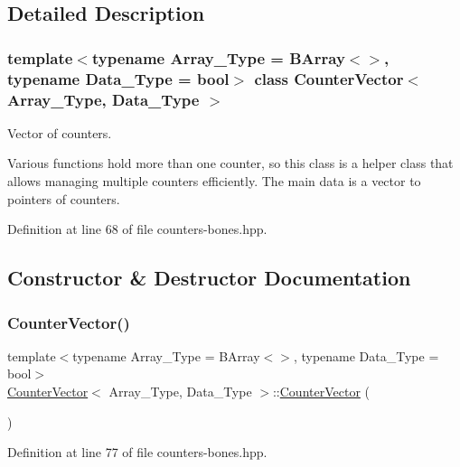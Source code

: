 \subsection{Detailed Description}
\subsubsection*{template$<$typename Array\+\_\+\+Type = B\+Array$<$$>$, typename Data\+\_\+\+Type = bool$>$\newline
class Counter\+Vector$<$ Array\+\_\+\+Type, Data\+\_\+\+Type $>$}

Vector of counters. 

Various functions hold more than one counter, so this class is a helper class that allows managing multiple counters efficiently. The main data is a vector to pointers of counters. 

Definition at line 68 of file counters-\/bones.\+hpp.



\subsection{Constructor \& Destructor Documentation}
\mbox{\label{class_counter_vector_a536074f2ce013785e547a7bc30bc1942}} 
\subsubsection{\texorpdfstring{Counter\+Vector()}{CounterVector()}\hspace{0.1cm}{\footnotesize\ttfamily [1/2]}}
{\footnotesize\ttfamily template$<$typename Array\+\_\+\+Type = B\+Array$<$$>$, typename Data\+\_\+\+Type = bool$>$ \\
\hyperlink{class_counter_vector}{Counter\+Vector}$<$ Array\+\_\+\+Type, Data\+\_\+\+Type $>$\+::\hyperlink{class_counter_vector}{Counter\+Vector} (\begin{DoxyParamCaption}{ }\end{DoxyParamCaption})\hspace{0.3cm}{\ttfamily [inline]}}



Definition at line 77 of file counters-\/bones.\+hpp.

\mbox{\label{class_counter_vector_ac6fc360b2df296630fb2614836dd74af}} 
